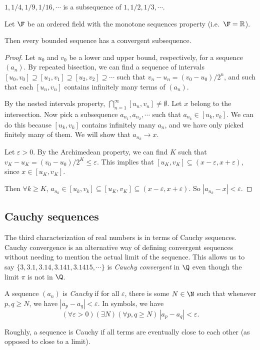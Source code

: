 \documentclass[a4paper]{article}
\begin{document}
\begin{eg}
  $1, 1/4, 1/9, 1/16, \cdots$ is a subsequence of $1, 1/2, 1/3, \cdots$.
\end{eg}


\begin{thm}
  Let $\F$ be an ordered field with the monotone sequences property (i.e.\ $\F = \mathbb{R}$).

  Then every bounded sequence has a convergent subsequence.
\end{thm}

\begin{proof}
  Let $u_0$ and $v_0$ be a lower and upper bound, respectively, for a sequence $(a_n)$. By repeated bisection, we can find a sequence of intervals $[u_0, v_0] \supseteq [u_1, v_1]\supseteq [u_2,v_2] \supseteq\cdots$ such that $v_n - u_n = (v_0 - u_0)/2^n$, and such that each $[u_n, v_n]$ contains infinitely many terms of $(a_n)$.

  By the nested intervals property, $\bigcap_{n = 1}^\infty [u_n, v_n] \not= \emptyset$. Let $x$ belong to the intersection. Now pick a subsequence $a_{n_1}, a_{n_2}, \cdots$ such that $a_{n_k} \in [u_k, v_k]$. We can do this because $[u_k, v_k]$ contains infinitely many $a_n$, and we have only picked finitely many of them. We will show that $a_{n_k} \to x$.

  Let $\varepsilon > 0$. By the Archimedean property, we can find $K$ such that $v_K - u_K = (v_0 - u_0)/2^K \leq \varepsilon$. This implies that $[u_K, v_K] \subseteq (x - \varepsilon, x + \varepsilon)$, since $x\in [u_K, v_K]$.

  Then $\forall k \geq K$, $a_{n_k}\in [u_k, v_k] \subseteq [u_K, v_K] \subseteq (x - \varepsilon, x + \varepsilon)$. So $|a_{n_k} - x| < \varepsilon$.
\end{proof}

\subsection{Cauchy sequences}
The third characterization of real numbers is in terms of Cauchy sequences. Cauchy convergence is an alternative way of defining convergent sequences without needing to mention the actual limit of the sequence. This allows us to say $\{3, 3.1, 3.14, 3.141, 3.1415, \cdots\}$ is \emph{Cauchy convergent} in $\Q$ even though the limit $\pi$ is not in $\Q$.

\begin{defi}
  A sequence $(a_n)$ is \emph{Cauchy} if for all $\varepsilon$, there is some $N \in \N$ such that whenever $p, q \geq N$, we have $|a_p - a_q| < \varepsilon$. In symbols, we have
  \[
    (\forall \varepsilon > 0)(\exists N)(\forall p, q\geq N)\, |a_p - a_q| < \varepsilon.
  \]
\end{defi}
Roughly, a sequence is Cauchy if all terms are eventually close to each other (as opposed to close to a limit).
\end{document}
